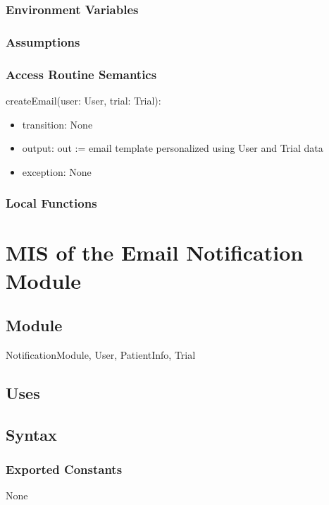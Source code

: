 \documentclass[12pt, titlepage]{article}
\begin{document}
\subsubsection{Environment Variables}

\subsubsection{Assumptions}

\subsubsection{Access Routine Semantics}

\noindent createEmail(user: User, trial: Trial):
\begin{itemize}
\item transition: None
\item output: out := email template personalized using User and Trial data
\item exception: None
\end{itemize}

\subsubsection{Local Functions}

\section{MIS of the Email Notification Module} \label{EmailNotification}

\subsection{Module}

NotificationModule, User, PatientInfo, Trial

\subsection{Uses}


\subsection{Syntax}

\subsubsection{Exported Constants}
None
\end{document}
